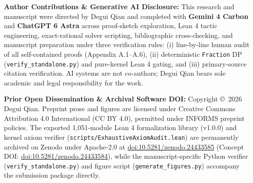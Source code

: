 \documentclass[11pt,letterpaper]{article}
\begin{document}
\vspace{6pt}
\noindent\textbf{Author Contributions \& Generative AI Disclosure:} This research and manuscript were directed by Degui Qian and completed with \textbf{Gemini 4 Carbon} and \textbf{ChatGPT 6 Astra} across proof-sketch exploration, Lean 4 tactic engineering, exact-rational solver scripting, bibliographic cross-checking, and manuscript preparation under three verification rules: (i) line-by-line human audit of all self-contained proofs (Appendix A.1--A.6), (ii) deterministic \texttt{Fraction} DP (\texttt{verify\_standalone.py}) and pure-kernel Lean 4 gating, and (iii) primary-source citation verification. AI systems are not co-authors; Degui Qian bears sole academic and legal responsibility for the work.

\vspace{6pt}
\noindent\textbf{Prior Open Dissemination \& Archival Software DOI:} Copyright \copyright\ 2026 Degui Qian. Preprint prose and figures are licensed under Creative Commons Attribution 4.0 International (CC BY 4.0), permitted under INFORMS preprint policies. The exported 1,051-module Lean 4 formalization library (v1.0.0) and kernel axiom verifier (\texttt{scripts/ExhaustiveAxiomAudit.lean}) are permanently archived on Zenodo under Apache-2.0 at \href{https://doi.org/10.5281/zenodo.24433585}{doi:10.5281/zenodo.24433585} (Concept DOI: \href{https://doi.org/10.5281/zenodo.24433584}{doi:10.5281/zenodo.24433584}), while the manuscript-specific Python verifier (\texttt{verify\_standalone.py}) and figure script (\texttt{generate\_figures.py}) accompany the submission package directly.
\end{document}
